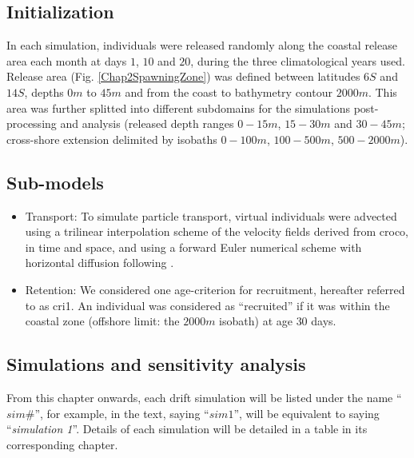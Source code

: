 \subsection{Initialization}\label{Chap2MethInit}

In each simulation, individuals were released randomly along the coastal release area each month at days $1$, $10$ and $20$, during the three climatological years used.\\

Release area (Fig. \ref{Chap2SpawningZone}) was defined between latitudes $6$\textdegree $S$ and $14$\textdegree $S$, depths $0 m$ to $45 m$ and from the coast to bathymetry contour $2000 m$. This area was further splitted into different subdomains for the simulations post-processing and analysis (released depth ranges $0-15 m$, $15-30 m$ and $30-45 m$; cross-shore extension delimited by isobaths $0-100 m$, $100-500 m$, $500-2000 m$).\\

\subsection{Sub-models}\label{Chap2MethSubMod}

\begin{itemize}

\item Transport: To simulate particle transport, virtual individuals were advected using a trilinear interpolation scheme of the velocity fields derived from \acrshort{croco}, in time and space, and using a forward Euler numerical scheme with horizontal diffusion following \cite{PeliMarc2007}.\\

\item Retention: We considered one age-criterion for recruitment, hereafter referred to as \gls{cri1}. An individual was considered as ``recruited'' if it was within the coastal zone (offshore limit: the $2000 m$ isobath) at age $30$ days.\\

\end{itemize}

\subsection{Simulations and sensitivity analysis}\label{Chap2MethSimSens}

From this chapter onwards, each drift simulation will be listed under the name ``\textbf{$sim \#$}'', for example, in the text, saying ``$sim 1$'', will be equivalent to saying ``\textit{simulation 1}''. Details of each simulation will be detailed in a table in its corresponding chapter.\\

